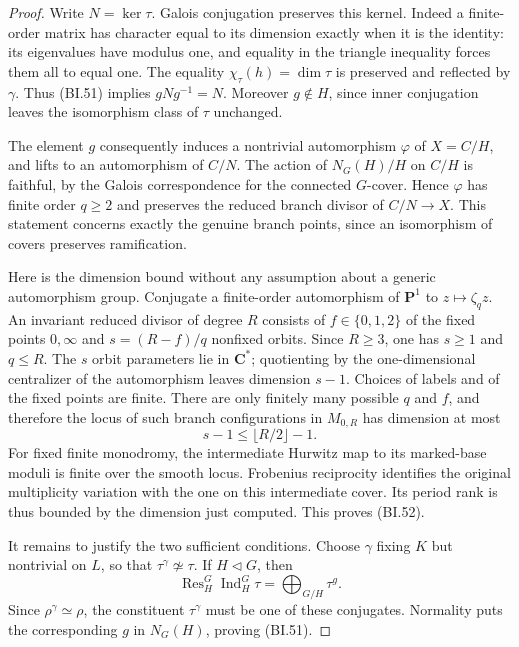 \begin{proof}
Write $N=\ker\tau$.  Galois conjugation preserves this kernel.
Indeed a finite-order matrix has character equal to its dimension
exactly when it is the identity: its eigenvalues have modulus one,
and equality in the triangle inequality forces them all to equal
one.  The equality $\chi_\tau(h)=\dim\tau$ is preserved and
reflected by $\gamma$.  Thus (BI.51) implies $gNg^{-1}=N$.
Moreover $g\notin H$, since inner conjugation leaves the
isomorphism class of $\tau$ unchanged.

The element $g$ consequently induces a nontrivial automorphism
$\varphi$ of $X=C/H$, and lifts to an automorphism of $C/N$.
The action of $N_G(H)/H$ on $C/H$ is faithful, by the
Galois correspondence for the connected $G$-cover.  Hence
$\varphi$ has finite order $q\ge2$ and preserves the reduced
branch divisor of $C/N\to X$.  This statement concerns exactly
the genuine branch points, since an isomorphism of covers
preserves ramification.

Here is the dimension bound without any assumption about a
generic automorphism group.  Conjugate a finite-order automorphism
of $\mathbf P^1$ to $z\mapsto\zeta_qz$.  An invariant reduced
divisor of degree $R$ consists of $f\in\{0,1,2\}$ of the fixed
points $0,\infty$ and $s=(R-f)/q$ nonfixed orbits.  Since
$R\ge3$, one has $s\ge1$ and $q\le R$.  The $s$ orbit
parameters lie in $\mathbf C^*$; quotienting by the one-dimensional
centralizer of the automorphism leaves dimension $s-1$.
Choices of labels and of the fixed points are finite.  There are
only finitely many possible $q$ and $f$, and therefore the locus
of such branch configurations in $M_{0,R}$ has dimension at most
\[
             s-1\le\lfloor R/2\rfloor-1.
\]
For fixed finite monodromy, the intermediate Hurwitz map to its
marked-base moduli is finite over the smooth locus.  Frobenius
reciprocity identifies the original multiplicity variation with
the one on this intermediate cover.  Its period rank is thus
bounded by the dimension just computed.  This proves (BI.52).

It remains to justify the two sufficient conditions.  Choose
$\gamma$ fixing $K$ but nontrivial on $L$, so that
$\tau^\gamma\not\simeq\tau$.  If $H\triangleleft G$, then
\[
       \operatorname{Res}_H^G\operatorname{Ind}_H^G\tau
                      =\bigoplus_{G/H}\tau^g.
\]
Since $\rho^\gamma\simeq\rho$, the constituent $\tau^\gamma$
must be one of these conjugates.  Normality puts the corresponding
$g$ in $N_G(H)$, proving (BI.51).


\end{proof}
